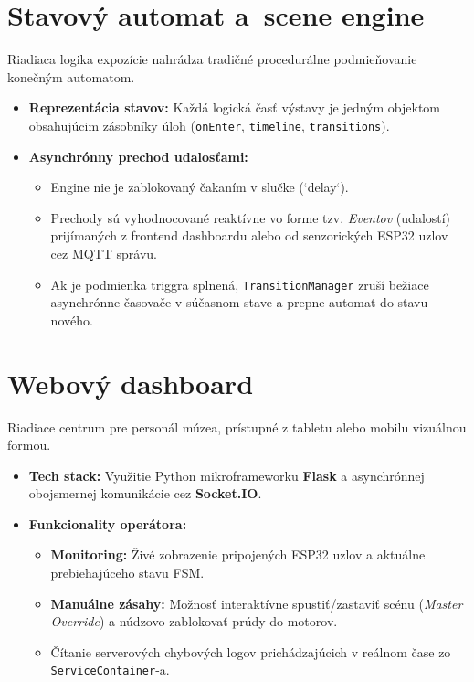 \section{Stavový automat a~scene engine}
\label{StavovyAutomat}

Riadiaca logika expozície nahrádza tradičné procedurálne podmieňovanie konečným automatom.
\begin{itemize}
    \item \textbf{Reprezentácia stavov:} Každá logická časť výstavy je jedným objektom obsahujúcim zásobníky úloh (\texttt{onEnter}, \texttt{timeline}, \texttt{transitions}).
    \item \textbf{Asynchrónny prechod udalosťami:}
    \begin{itemize}
        \item Engine nie je zablokovaný čakaním v slučke (`delay`).
        \item Prechody sú vyhodnocované reaktívne vo forme tzv. \textit{Eventov} (udalostí) prijímaných z frontend dashboardu alebo od senzorických ESP32 uzlov cez MQTT správu.
        \item Ak je podmienka triggra splnená, \texttt{TransitionManager} zruší bežiace asynchrónne časovače v súčasnom stave a prepne automat do stavu nového.
    \end{itemize}
\end{itemize}

\section{Webový dashboard}
\label{WebovyDashboard}

Riadiace centrum pre personál múzea, prístupné z tabletu alebo mobilu vizuálnou formou.
\begin{itemize}
    \item \textbf{Tech stack:} Využitie Python mikroframeworku \textbf{Flask} a asynchrónnej obojsmernej komunikácie cez \textbf{Socket.IO}.
    \item \textbf{Funkcionality operátora:}
    \begin{itemize}
        \item \textbf{Monitoring:} Živé zobrazenie pripojených ESP32 uzlov a aktuálne prebiehajúceho stavu FSM.
        \item \textbf{Manuálne zásahy:} Možnosť interaktívne spustiť/zastaviť scénu (\textit{Master Override}) a núdzovo zablokovať prúdy do motorov.
        \item Čítanie serverových chybových logov prichádzajúcich v reálnom čase zo \texttt{ServiceContainer}-a.
    \end{itemize}
\end{itemize}


